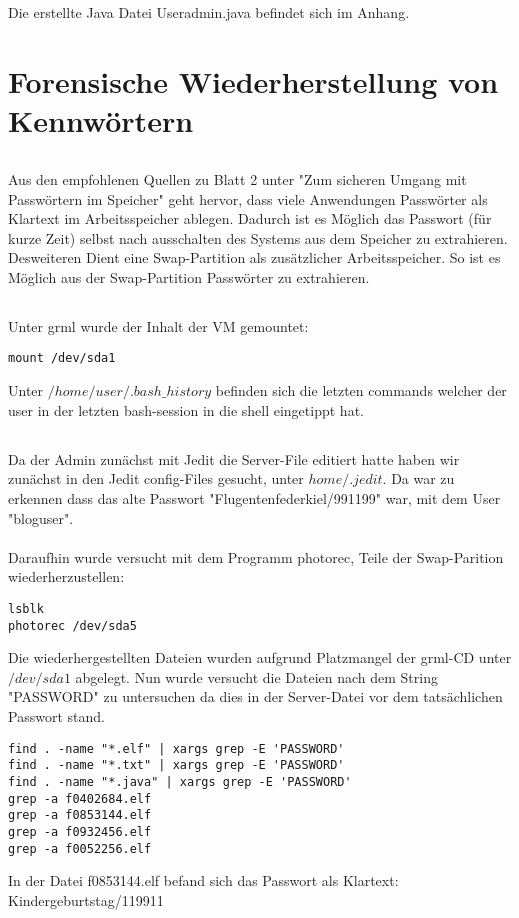 \documentclass[12pt]{article}
\theoremstyle{plain}
\begin{document}
\subsection{}
Die erstellte Java Datei Useradmin.java befindet sich im Anhang.
\section{Forensische Wiederherstellung von Kennwörtern}
\subsection{}
Aus den empfohlenen Quellen zu Blatt 2 unter "Zum sicheren Umgang mit Passwörtern im Speicher" geht hervor, dass viele Anwendungen Passwörter als Klartext im Arbeitsspeicher ablegen. Dadurch ist es Möglich das Passwort (für kurze Zeit) selbst nach ausschalten des Systems aus dem Speicher zu extrahieren. Desweiteren Dient eine Swap-Partition als zusätzlicher Arbeitsspeicher. So ist es Möglich aus der Swap-Partition Passwörter zu extrahieren.
\subsection{}
Unter grml wurde der Inhalt der VM gemountet:
\begin{lstlisting} 
mount /dev/sda1
\end{lstlisting}
Unter $/home/user/.bash\_history$ befinden sich die letzten commands welcher der user in der letzten bash-session in die shell eingetippt hat.
\subsection{}
Da der Admin zunächst mit Jedit die Server-File editiert hatte haben wir zunächst in den Jedit config-Files gesucht, unter $home/.jedit$. Da war zu erkennen dass das alte Passwort "Flugentenfederkiel/991199" war, mit dem User "bloguser". \\ \\ Daraufhin wurde versucht mit dem Programm photorec, Teile der Swap-Parition wiederherzustellen:
\begin{lstlisting}
lsblk
photorec /dev/sda5
\end{lstlisting}
Die wiederhergestellten Dateien wurden aufgrund Platzmangel der grml-CD unter $/dev/sda1$ abgelegt. Nun wurde versucht die Dateien nach dem String "PASSWORD" zu untersuchen da dies in der Server-Datei vor dem tatsächlichen Passwort stand.
\begin{lstlisting}
find . -name "*.elf" | xargs grep -E 'PASSWORD'
find . -name "*.txt" | xargs grep -E 'PASSWORD'
find . -name "*.java" | xargs grep -E 'PASSWORD'
grep -a f0402684.elf
grep -a f0853144.elf
grep -a f0932456.elf
grep -a f0052256.elf
\end{lstlisting}
In der Datei f0853144.elf befand sich das Passwort als Klartext: Kindergeburtstag/119911
\end{document}
